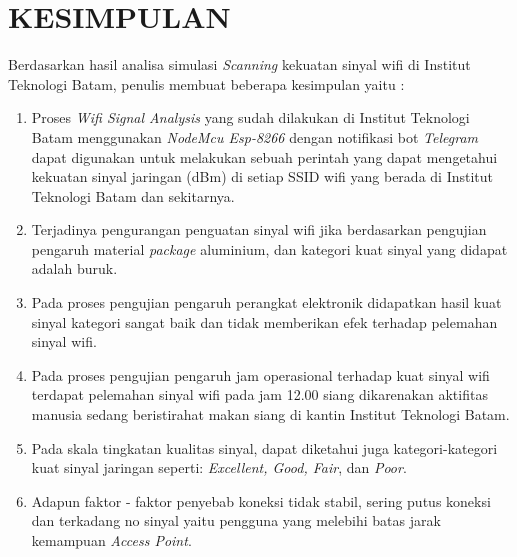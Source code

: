 \documentclass[conference]{IEEEtran}
\begin{document}
\section{KESIMPULAN}
Berdasarkan hasil analisa simulasi \textit{Scanning} kekuatan sinyal wifi di Institut Teknologi Batam, penulis membuat beberapa kesimpulan yaitu :
\begin{enumerate}
    \item Proses \textit{Wifi Signal Analysis} yang sudah dilakukan di Institut Teknologi Batam menggunakan \textit{NodeMcu Esp-8266} dengan notifikasi bot \textit{Telegram} dapat digunakan untuk melakukan sebuah perintah yang dapat mengetahui kekuatan sinyal jaringan (dBm) di setiap SSID wifi yang berada di Institut Teknologi Batam dan sekitarnya.
    \item Terjadinya pengurangan penguatan sinyal wifi jika berdasarkan pengujian pengaruh material \textit{package} aluminium, dan kategori kuat sinyal yang didapat adalah buruk.
    \item Pada proses pengujian pengaruh perangkat elektronik didapatkan hasil kuat sinyal kategori sangat baik dan tidak memberikan efek terhadap pelemahan sinyal wifi.
    \item Pada proses pengujian pengaruh jam operasional terhadap kuat sinyal wifi terdapat pelemahan sinyal wifi pada jam 12.00 siang dikarenakan aktifitas manusia sedang beristirahat makan siang di kantin Institut Teknologi Batam.
    \item Pada skala tingkatan kualitas sinyal, dapat diketahui juga kategori-kategori kuat sinyal jaringan seperti: \textit{Excellent, Good, Fair}, dan \textit{Poor}.
    \item Adapun faktor - faktor penyebab koneksi tidak stabil, sering putus koneksi dan terkadang no sinyal yaitu pengguna yang melebihi batas jarak kemampuan \textit{Access Point}.
\end{enumerate}
\end{document}

